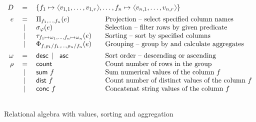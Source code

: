 \documentclass[a4paper,UKenglish]{lipics-v2016}
\theoremstyle{plain}
\theoremstyle{definition}
\newcommand{\vect}[1]{\langl #1 \rangl}
\newcommand{\langl}{\begin{picture}(4.5,7)
\put(1.1,2.5){\rotatebox{60}{\line(1,0){5.5}}}
\put(1.1,2.5){\rotatebox{300}{\line(1,0){5.5}}}
\end{picture}}
\newcommand{\rangl}{\begin{picture}(4.5,7)
\put(.9,2.5){\rotatebox{120}{\line(1,0){5.5}}}
\put(.9,2.5){\rotatebox{240}{\line(1,0){5.5}}}
\end{picture}}
\newcommand{\lsep}{~\,|\,~}
\newcommand{\ident}[1]{\textnormal{\sffamily #1}}
\begin{document}
\begin{figure}

\begin{equation*}
\begin{array}{rclll}
  D & = & \multicolumn{3}{l}{ 
    \{f_1\mapsto \vect{v_{1,1},\ldots,v_{1,r}}, \ldots, f_n\mapsto \vect{v_{n,1},\ldots,v_{n,r}}\} 
  }\\[0.5em]
  e & = & \Pi_{f_1, \ldots, f_n} (e) &&\textnormal{Projection -- select specified column names}\\
   & \lsep & \sigma_\varphi (e) &&\textnormal{Selection -- filter rows by given predicate}\\
   & \lsep & \tau_{f_1\mapsto\omega_1, \ldots, f_n\mapsto\omega_n}(e) &&\textnormal{Sorting -- sort by specified columns}\\
   & \lsep & \Phi_{f, \rho_1/f_1, \ldots, \rho_n/f_n} (e) &&\textnormal{Grouping -- group by and calculate aggregates}
   \\[0.5em]
  \omega & = & \ident{desc}\lsep\ident{asc}  &&\textnormal{Sort order -- descending or ascending}\\
  \rho & = & \ident{count}  &&\textnormal{Count number of rows in the group}\\
   & \lsep & \ident{sum}~f  &&\textnormal{Sum numerical values of the column $f$}\\
   & \lsep & \ident{dist}~f &&\textnormal{Count number of distinct values of the column $f$}\\
   & \lsep & \ident{conc}~f &&\textnormal{Concatenat string values of the column $f$}\\
\\
\end{array} 
\end{equation*}

\vspace{-1.5em}
\caption{Relational algebra with values, sorting and aggregation}
\label{fig:foo-rel}
\end{figure}

\end{document}
